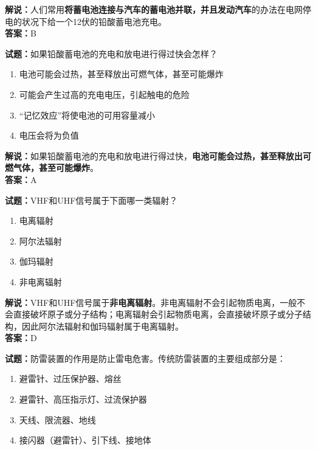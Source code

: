\documentclass{ctexbook}
\begin{document}
\noindent\textbf{解说：}人们常用\textbf{将蓄电池连接与汽车的蓄电池并联，并且发动汽车}的办法在电网停电的状况下给一个12伏的铅酸蓄电池充电。\\\noindent\textbf{答案：}B%

\bigskip


\noindent\textbf{试题：}如果铅酸蓄电池的充电和放电进行得过快会怎样？

\begin{enumerate}[leftmargin=3em]
	\item 电池可能会过热，甚至释放出可燃气体，甚至可能爆炸
	\item 可能会产生过高的充电电压，引起触电的危险
	\item “记忆效应”将使电池的可用容量减小
	\item 电压会将为负值
\end{enumerate}

\noindent\textbf{解说：}如果铅酸蓄电池的充电和放电进行得过快，\textbf{电池可能会过热，甚至释放出可燃气体，甚至可能爆炸}。\\\noindent\textbf{答案：}A%

\bigskip


\noindent\textbf{试题：}VHF和UHF信号属于下面哪一类辐射？

\begin{enumerate}[leftmargin=3em]
	\item 电离辐射
	\item 阿尔法辐射
	\item 伽玛辐射
	\item 非电离辐射
\end{enumerate}

\noindent\textbf{解说：}VHF和UHF信号属于\textbf{非电离辐射}。非电离辐射不会引起物质电离，一般不会直接破坏原子或分子结构；电离辐射会引起物质电离，会直接破坏原子或分子结构，因此阿尔法辐射和伽玛辐射属于电离辐射。\\\noindent\textbf{答案：}D

\bigskip


\noindent\textbf{试题：}防雷装置的作用是防止雷电危害。传统防雷装置的主要组成部分是：

\begin{enumerate}[leftmargin=3em]
	\item 避雷针、过压保护器、熔丝
	\item 避雷针、高压指示灯、过流保护器
	\item 天线、限流器、地线
	\item 接闪器（避雷针）、引下线、接地体
\end{enumerate}
\end{document}
